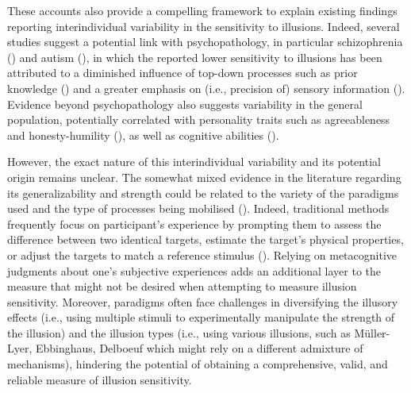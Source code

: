 \documentclass[
  man,
  floatsintext,
  longtable,
  nolmodern,
  notxfonts,
  notimes,
  colorlinks=true,linkcolor=blue,citecolor=blue,urlcolor=blue]{apa7}
\begin{document}
These accounts also provide a compelling framework to explain existing
findings reporting interindividual variability in the sensitivity to
illusions. Indeed, several studies suggest a potential link with
psychopathology, in particular schizophrenia
() and autism
(), in which the reported
lower sensitivity to illusions has been attributed to a diminished
influence of top-down processes such as prior knowledge
() and a greater
emphasis on (i.e., precision of) sensory information
(). Evidence beyond
psychopathology also suggests variability in the general population,
potentially correlated with personality traits such as agreeableness and
honesty-humility (),
as well as cognitive abilities ().

However, the exact nature of this interindividual variability and its
potential origin remains unclear. The somewhat mixed evidence in the
literature regarding its generalizability and strength could be related
to the variety of the paradigms used and the type of processes being
mobilised (). Indeed,
traditional methods frequently focus on participant's experience by
prompting them to assess the difference between two identical targets,
estimate the target's physical properties, or adjust the targets to
match a reference stimulus (). Relying on metacognitive judgments about one's subjective
experiences adds an additional layer to the measure that might not be
desired when attempting to measure illusion sensitivity. Moreover,
paradigms often face challenges in diversifying the illusory effects
(i.e., using multiple stimuli to experimentally manipulate the strength
of the illusion) and the illusion types (i.e., using various illusions,
such as Müller-Lyer, Ebbinghaus, Delboeuf which might rely on a
different admixture of mechanisms), hindering the potential of obtaining
a comprehensive, valid, and reliable measure of illusion sensitivity.
\end{document}
